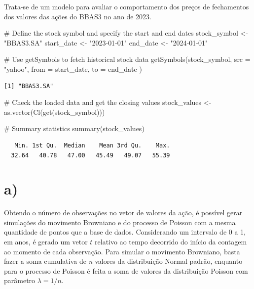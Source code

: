 \documentclass[
  letterpaper,
  DIV=11,
  numbers=noendperiod]{scrreprt}
\newenvironment{Shaded}{\begin{snugshade}}{\end{snugshade}}
\newcommand{\AttributeTok}[1]{\textcolor[rgb]{0.40,0.45,0.13}{#1}}
\newcommand{\CommentTok}[1]{\textcolor[rgb]{0.37,0.37,0.37}{#1}}
\newcommand{\FunctionTok}[1]{\textcolor[rgb]{0.28,0.35,0.67}{#1}}
\newcommand{\NormalTok}[1]{\textcolor[rgb]{0.00,0.23,0.31}{#1}}
\newcommand{\OtherTok}[1]{\textcolor[rgb]{0.00,0.23,0.31}{#1}}
\newcommand{\StringTok}[1]{\textcolor[rgb]{0.13,0.47,0.30}{#1}}
\begin{document}

Trata-se de um modelo para avaliar o comportamento dos preços de
fechamentos dos valores das ações do BBAS3 no ano de 2023.

\begin{Shaded}
\begin{Highlighting}[]
\CommentTok{\# Define the stock symbol and specify the start and end dates}
\NormalTok{stock\_symbol }\OtherTok{\textless{}{-}} \StringTok{"BBAS3.SA"}
\NormalTok{start\_date }\OtherTok{\textless{}{-}} \StringTok{"2023{-}01{-}01"}
\NormalTok{end\_date }\OtherTok{\textless{}{-}} \StringTok{"2024{-}01{-}01"}

\CommentTok{\# Use getSymbols to fetch historical stock data}
\FunctionTok{getSymbols}\NormalTok{(stock\_symbol,}
    \AttributeTok{src =} \StringTok{"yahoo"}\NormalTok{,}
    \AttributeTok{from =}\NormalTok{ start\_date,}
    \AttributeTok{to =}\NormalTok{ end\_date}
\NormalTok{)}
\end{Highlighting}
\end{Shaded}

\begin{verbatim}
[1] "BBAS3.SA"
\end{verbatim}

\begin{Shaded}
\begin{Highlighting}[]
\CommentTok{\# Check the loaded data and get the closing values}
\NormalTok{stock\_values }\OtherTok{\textless{}{-}} \FunctionTok{as.vector}\NormalTok{(}\FunctionTok{Cl}\NormalTok{(}\FunctionTok{get}\NormalTok{(stock\_symbol)))}

\CommentTok{\# Summary statistics}
\FunctionTok{summary}\NormalTok{(stock\_values)}
\end{Highlighting}
\end{Shaded}

\begin{verbatim}
   Min. 1st Qu.  Median    Mean 3rd Qu.    Max. 
  32.64   40.78   47.00   45.49   49.07   55.39 
\end{verbatim}

\hypertarget{a-1}{%
\section*{a)}\label{a-1}}


Obtendo o número de observações no vetor de valores da ação, é possível
gerar simulações do movimento Browniano e do processo de Poisson com a
mesma quantidade de pontos que a base de dados. Considerando um
intervalo de 0 a 1, em anos, é gerado um vetor \(t\) relativo ao tempo
decorrido do início da contagem ao momento de cada observação. Para
simular o movimento Browniano, basta fazer a soma cumulativa de \emph{n}
valores da distribuição Normal padrão, enquanto para o processo de
Poisson é feita a soma de valores da distribuição Poisson com parâmetro
\(\lambda=1/n\).
\end{document}
